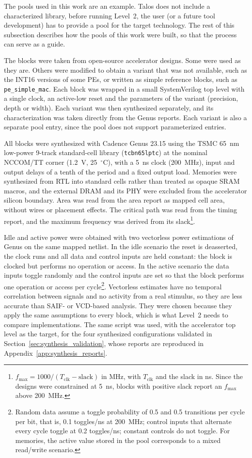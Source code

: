 The pools used in this work are an example. Talos does not
include a characterized library, before running Level~2, the user (or a future tool development) has
to provide a pool for the target technology. The rest of this
subsection describes how the pools of this work were built, so that
the process can serve as a guide.

The blocks were taken from open-source accelerator designs. Some were
used as they are. Others were modified to obtain a variant that was
not available, such as the INT16 versions of some PEs, or written as
simple reference blocks, such as \texttt{pe\_simple\_mac}. Each block
was wrapped in a small SystemVerilog top level with a single clock, an
active-low reset and the parameters of the variant (precision, depth
or width). Each variant was then synthesized separately, and its
characterization was taken directly from the Genus reports. Each
variant is also a separate pool entry, since the pool does not
support parameterized entries.

All blocks were synthesized with Cadence Genus 23.15 using the TSMC
65~nm low-power 9-track standard-cell library (\texttt{tcbn65lptc})
at the nominal NCCOM/TT corner (1.2~V, 25~$^\circ$C), with a 5~ns
clock (200~MHz), input and output delays of a tenth of the period and
a fixed output load. Memories were synthesized from RTL into standard
cells rather than treated as opaque SRAM macros, and the external DRAM
and its PHY were excluded from the accelerator silicon boundary. Area
was read from the area report as mapped cell area, without wires or
placement effects. The critical path was read from the timing report,
and the maximum frequency was derived from its
slack\footnote{$f_{\max} = 1000 / (T_{\mathrm{clk}} - \mathrm{slack})$
in MHz, with $T_{\mathrm{clk}}$ and the slack in ns. Since the designs
were constrained at 5~ns, blocks with positive slack report an
$f_{\max}$ above 200~MHz.}.

Idle and active power were obtained with two vectorless power
estimations of Genus on the same mapped netlist. In the idle scenario
the reset is deasserted, the clock runs and all data and control
inputs are held constant: the block is clocked but performs no
operation or access. In the active scenario the data inputs toggle
randomly and the control inputs are set so that the block performs
one operation or access per cycle\footnote{Random data assume a
toggle probability of 0.5 and 0.5 transitions per cycle per bit, that
is, 0.1 toggles/ns at 200~MHz; control inputs that alternate every
cycle toggle at 0.2 toggles/ns; constant controls do not toggle. For
memories, the active value stored in the pool corresponds to a mixed
read/write scenario.}. Vectorless estimates have no temporal
correlation between signals and no activity from a real stimulus, so
they are less accurate than SAIF- or VCD-based analysis. They were
chosen because they apply the same assumptions to every block, which
is what Level~2 needs to compare implementations. The same script was
used, with the accelerator top level as the target, for the four
synthesized configurations validated in
Section~\ref{sec:synthesis_validation}, whose reports are reproduced
in Appendix~\ref{app:synthesis_reports}.

